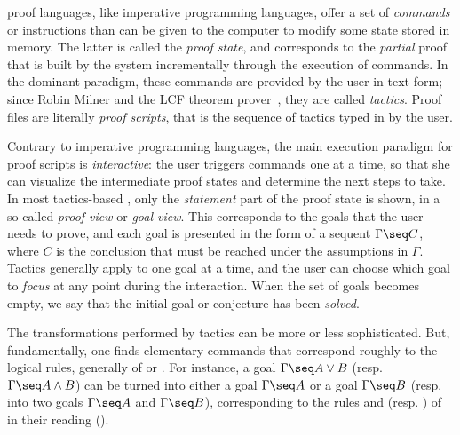 \begin{description}[labelsep=0pt]
  \item[Imperative~]proof languages, like imperative programming languages,
  offer a set of \emph{commands} or instructions than can be given to the
  computer to modify some state stored in memory. The latter is called the
  \emph{proof state}, and corresponds to the \emph{partial} proof that is built
  by the system incrementally through the execution of commands. In the dominant
  paradigm, these commands are provided by the user in text form; since Robin
  Milner and the LCF theorem prover~, they
  are called \emph{tactics}. Proof files are literally \emph{proof scripts},
  that is the sequence of tactics typed in by the user.
  
  Contrary to imperative programming languages, the main execution paradigm for
  proof scripts is \emph{interactive}: the user triggers commands one at a time,
  so that she can visualize the intermediate proof states and determine the next
  steps to take. In most tactics-based ,
  only the \emph{statement} part of the proof state is shown, in a so-called
  \emph{proof view} or \emph{goal view}. This corresponds to the goals that the
  user needs to prove, and each goal is presented in the form of a sequent
  $\Gamma \seq C$, where $C$ is the conclusion that must be reached under the
  assumptions in $\Gamma$. Tactics generally apply to one goal at a time, and
  the user can choose which goal to \emph{focus} at any point during the
  interaction. When the set of goals becomes empty, we say that the initial goal
  or conjecture has been \emph{solved}.

  The transformations performed by tactics can be more or less sophisticated.
  But, fundamentally, one finds elementary commands that correspond roughly to
  the logical rules, generally of  or . For
  instance, a goal $\Gamma\seq A\lor B$ (resp. $\Gamma\seq A\land B$) can be
  turned into either a goal $\Gamma\seq A$ or a goal $\Gamma\seq B$ (resp. into
  two goals $\Gamma\seq A$ and $\Gamma\seq B$), corresponding to the rules
   and  (resp. ) of  in their
   reading ().


\end{description}
